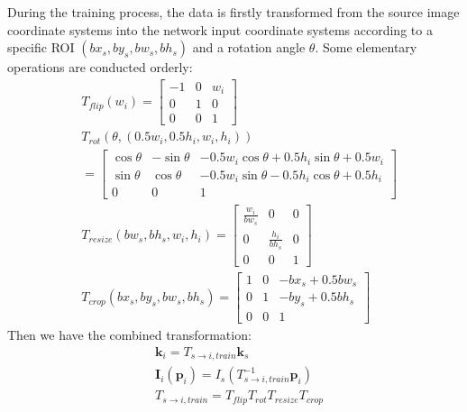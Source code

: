 \documentclass[10pt,journal,compsoc]{IEEEtran}
\begin{document}
During the training process, the data is firstly transformed from the source image coordinate systems into the network input coordinate systems according to a specific ROI $(bx_s,by_s,bw_s,bh_s)$ and a rotation angle $\theta$. Some elementary operations are conducted orderly:
\begin{equation}
    \begin{split}
    &T_{flip}(w_i)=\begin{bmatrix} -1 & 0 & w_i \\
                    0 & 1 & 0 \\
                    0 & 0 &1 \end{bmatrix}\\
    &T_{rot}(\theta,(0.5w_i,0.5h_i,w_i,h_i))\\
    &=\begin{bmatrix} \cos\theta  & -\sin\theta & -0.5w_i\cos\theta+0.5h_i\sin\theta+0.5w_i \\
                      \sin\theta  &  \cos\theta & -0.5w_i\sin\theta-0.5h_i\cos\theta+0.5h_i \\
                    0& 0 &1 \end{bmatrix}\\
    &T_{resize}(bw_s,bh_s,w_i,h_i)=\begin{bmatrix} \frac{w_i}{bw_s} & 0 & 0 \\
                    0 & \frac{h_i}{bh_s} & 0 \\
                    0 & 0 &1 \end{bmatrix}\\
    &T_{crop}(bx_s,by_s,bw_s,bh_s)=\begin{bmatrix} 1 & 0 & -bx_s+0.5bw_s \\
                    0 & 1 & -by_s+0.5bh_s \\
                    0 & 0 &1 \end{bmatrix}
    \end{split}
\end{equation}
Then we have the combined transformation:
\begin{equation}
\label{eq:source2input}
    \begin{split}
    &\textbf{k}_i = T_{s\rightarrow i,train}\textbf{k}_s \\
    &\textbf{I}_i(\textbf{p}_i) = I_s(T_{s\rightarrow i,train}^{-1}\textbf{p}_i)\\
    &T_{s\rightarrow i,train} = T_{flip}T_{rot}T_{resize}T_{crop}
    \end{split}
\end{equation}
\end{document}
